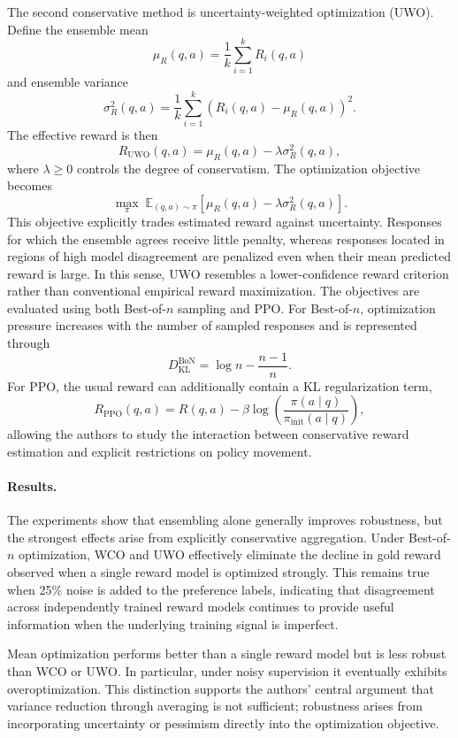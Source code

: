 \documentclass[11pt]{article}
\begin{document}
The second conservative method is uncertainty-weighted optimization (UWO). Define the ensemble mean
\[
\mu_R(q,a)
=
\frac{1}{k}
\sum_{i=1}^{k}
R_i(q,a)
\]
and ensemble variance
\[
\sigma_R^2(q,a)
=
\frac{1}{k}
\sum_{i=1}^{k}
\left(
R_i(q,a)-\mu_R(q,a)
\right)^2.
\]
The effective reward is then
\[
R_{\mathrm{UWO}}(q,a)
=
\mu_R(q,a)
-
\lambda
\sigma_R^2(q,a),
\]
where $\lambda\geq 0$ controls the degree of conservatism. The optimization objective becomes
\[
\max_{\pi}
\;
\mathbb{E}_{(q,a)\sim\pi}
\left[
\mu_R(q,a)
-
\lambda\sigma_R^2(q,a)
\right].
\]
This objective explicitly trades estimated reward against uncertainty. Responses for which the ensemble agrees receive little penalty, whereas responses located in regions of high model disagreement are penalized even when their mean predicted reward is large. In this sense, UWO resembles a lower-confidence reward criterion rather than conventional empirical reward maximization.
The objectives are evaluated using both Best-of-$n$ sampling and PPO. For Best-of-$n$, optimization pressure increases with the number of sampled responses and is represented through
\[
D_{\mathrm{KL}}^{\mathrm{BoN}}
=
\log n
-
\frac{n-1}{n}.
\]
For PPO, the usual reward can additionally contain a KL regularization term,
\[
R_{\mathrm{PPO}}(q,a)
=
R(q,a)
-
\beta
\log
\left(
\frac{\pi(a\mid q)}
{\pi_{\mathrm{init}}(a\mid q)}
\right),
\]
allowing the authors to study the interaction between conservative reward estimation and explicit restrictions on policy movement.

\paragraph{Results.}
The experiments show that ensembling alone generally improves robustness, but the strongest effects arise from explicitly conservative aggregation. Under Best-of-$n$ optimization, WCO and UWO effectively eliminate the decline in gold reward observed when a single reward model is optimized strongly. This remains true when 25\% noise is added to the preference labels, indicating that disagreement across independently trained reward models continues to provide useful information when the underlying training signal is imperfect.

Mean optimization performs better than a single reward model but is less robust than WCO or UWO. In particular, under noisy supervision it eventually exhibits overoptimization. This distinction supports the authors' central argument that variance reduction through averaging is not sufficient; robustness arises from incorporating uncertainty or pessimism directly into the optimization objective.
\end{document}
